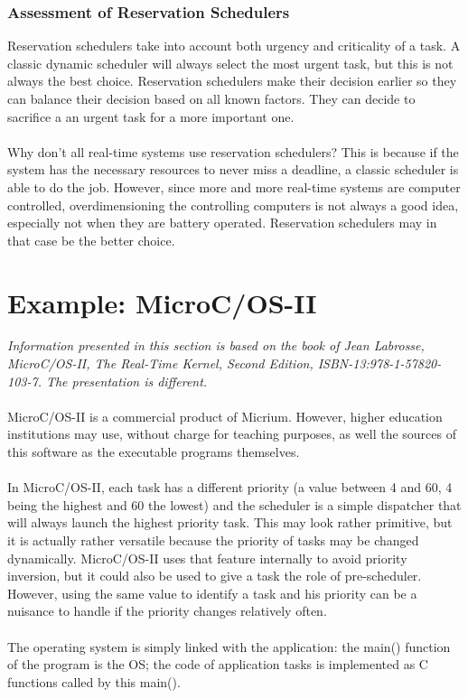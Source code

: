 \documentclass[../main.tex]{subfiles}
\begin{document}
\subsubsection{Assessment of Reservation Schedulers}
Reservation schedulers take into account both urgency and criticality of a task. A classic dynamic scheduler will always select the most urgent task, but this is not always the best choice. Reservation schedulers make their decision earlier so they can balance their decision based on all known factors. They can decide to sacrifice a an urgent task for a more important one.
\\\\
Why don't all real-time systems use reservation schedulers? This is because if the system has the necessary resources to never miss a deadline, a classic scheduler is able to do the job. However, since more and more real-time systems are computer controlled, overdimensioning the controlling computers is not always a good idea, especially not when they are battery operated. Reservation schedulers may in that case be the better choice.

\section{Example: MicroC/OS-II}
\textit{Information presented in this section is based on the book of Jean Labrosse, MicroC/OS-II, The Real-Time Kernel, Second Edition, ISBN-13:978-1-57820-103-7. The presentation is different.}
\\\\
MicroC/OS-II is a commercial product of Micrium. However, higher education institutions may use, without charge for teaching purposes, as well the sources of this software as the executable programs themselves.
\\\\
In MicroC/OS-II, each task has a different priority (a value between 4 and 60, 4 being the highest and 60 the lowest) and the scheduler is a simple dispatcher that will always launch the highest priority task. This may look rather primitive, but it is actually rather versatile because the priority of tasks may be changed dynamically. MicroC/OS-II uses that feature internally to avoid priority inversion, but it could also be used to give a task the role of pre-scheduler. However, using the same value to identify a task and his priority can be a nuisance to handle if the priority changes relatively often.
\\\\
The operating system is simply linked with the application: the main() function of the program is the OS; the code of application tasks is implemented as C functions called by this main().
\end{document}
